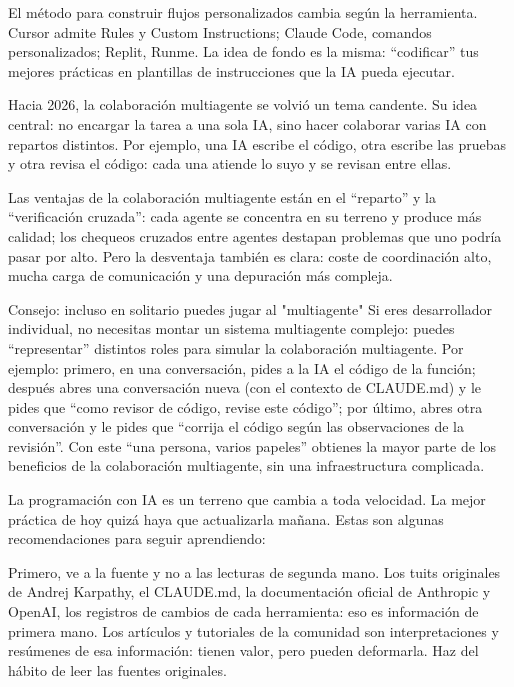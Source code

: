 El método para construir flujos personalizados cambia según la herramienta. Cursor admite Rules y Custom Instructions; Claude Code, comandos personalizados; Replit, Runme. La idea de fondo es la misma: “codificar” tus mejores prácticas en plantillas de instrucciones que la IA pueda ejecutar.


Hacia 2026, la colaboración multiagente se volvió un tema candente. Su idea central: no encargar la tarea a una sola IA, sino hacer colaborar varias IA con repartos distintos. Por ejemplo, una IA escribe el código, otra escribe las pruebas y otra revisa el código: cada una atiende lo suyo y se revisan entre ellas.

Las ventajas de la colaboración multiagente están en el “reparto” y la “verificación cruzada”: cada agente se concentra en su terreno y produce más calidad; los chequeos cruzados entre agentes destapan problemas que uno podría pasar por alto. Pero la desventaja también es clara: coste de coordinación alto, mucha carga de comunicación y una depuración más compleja.

\begin{tcbinfo}{Consejo: incluso en solitario puedes jugar al "multiagente"}
Si eres desarrollador individual, no necesitas montar un sistema multiagente complejo: puedes “representar” distintos roles para simular la colaboración multiagente. Por ejemplo: primero, en una conversación, pides a la IA el código de la función; después abres una conversación nueva (con el contexto de CLAUDE.md) y le pides que “como revisor de código, revise este código”; por último, abres otra conversación y le pides que “corrija el código según las observaciones de la revisión”. Con este “una persona, varios papeles” obtienes la mayor parte de los beneficios de la colaboración multiagente, sin una infraestructura complicada.

\end{tcbinfo}


La programación con IA es un terreno que cambia a toda velocidad. La mejor práctica de hoy quizá haya que actualizarla mañana. Estas son algunas recomendaciones para seguir aprendiendo:

Primero, ve a la fuente y no a las lecturas de segunda mano. Los tuits originales de Andrej Karpathy, el CLAUDE.md, la documentación oficial de Anthropic y OpenAI, los registros de cambios de cada herramienta: eso es información de primera mano. Los artículos y tutoriales de la comunidad son interpretaciones y resúmenes de esa información: tienen valor, pero pueden deformarla. Haz del hábito de leer las fuentes originales.

